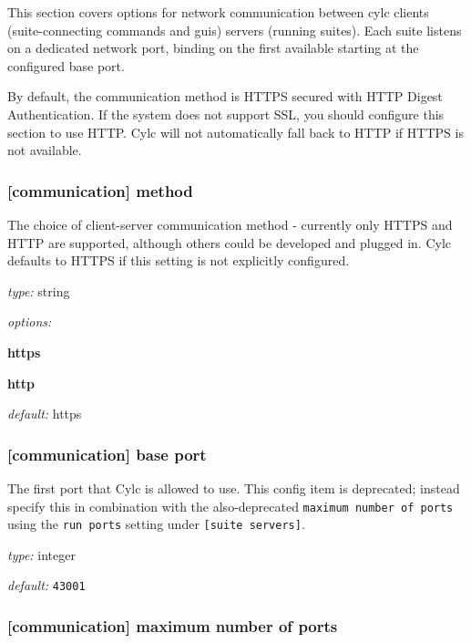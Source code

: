 This section covers options for network communication between cylc
clients (suite-connecting commands and guis) servers (running suites).
Each suite listens on a dedicated network port, binding on the first
available starting at the configured base port.

By default, the communication method is HTTPS secured with HTTP Digest
Authentication. If the system does not support SSL, you should configure
this section to use HTTP. Cylc will not automatically fall back to HTTP
if HTTPS is not available.

\subsubsection[method]{[communication] \textrightarrow method }

The choice of client-server communication method - currently only HTTPS
and HTTP are supported, although others could be developed and plugged in.
Cylc defaults to HTTPS if this setting is not explicitly configured.

\begin{myitemize}
\item {\em type:} string
\item {\em options:}
    \begin{myitemize}
    \item {\bf https}
    \item {\bf http}
    \end{myitemize}
\item {\em default:} https
\end{myitemize}

\subsubsection[base port]{[communication] \textrightarrow base port }

The first port that Cylc is allowed to use. This config item is deprecated;
instead specify this in combination with the also-deprecated
\lstinline=maximum number of ports= using the \lstinline=run ports=
setting under \lstinline=[suite servers]=.

\begin{myitemize}
\item {\em type:} integer
\item {\em default:} \lstinline=43001=
\end{myitemize}

\subsubsection[maximum number of ports]{[communication] \textrightarrow maximum number of ports}

